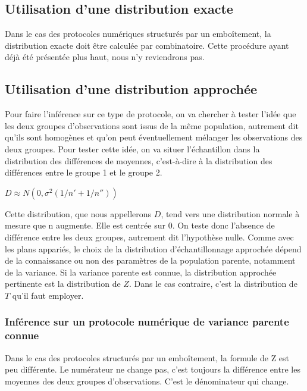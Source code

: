 \documentclass[]{book}
\theoremstyle{definition}
\theoremstyle{definition}
\theoremstyle{definition}
\theoremstyle{remark}
\begin{document}
\hypertarget{utilisation-dune-distribution-exacte-5}{%
\subsection{Utilisation d'une distribution
exacte}\label{utilisation-dune-distribution-exacte-5}}

Dans le cas des protocoles numériques structurés par un emboîtement, la
distribution exacte doit être calculée par combinatoire. Cette procédure
ayant déjà été présentée plus haut, nous n'y reviendrons pas.

\hypertarget{utilisation-dune-distribution-approchee-5}{%
\subsection{Utilisation d'une distribution
approchée}\label{utilisation-dune-distribution-approchee-5}}

Pour faire l'inférence sur ce type de protocole, on va chercher à tester
l'idée que les deux groupes d'observations sont issus de la même
population, autrement dit qu'ils sont homogènes et qu'on peut
éventuellement mélanger les observations des deux groupes. Pour tester
cette idée, on va situer l'échantillon dans la distribution des
différences de moyennes, c'est-à-dire à la distribution des différences
entre le groupe 1 et le groupe 2.

\(D\approx N(0,\sigma^{2}(1/n{}'+1/n{}''))\)

Cette distribution, que nous appellerons \(D\), tend vers une
distribution normale à mesure que n augmente. Elle est centrée sur 0. On
teste donc l'absence de différence entre les deux groupes, autrement dit
l'hypothèse nulle. Comme avec les plans appariés, le choix de la
distribution d'échantillonnage approchée dépend de la connaissance ou
non des paramètres de la population parente, notamment de la variance.
Si la variance parente est connue, la distribution approchée pertinente
est la distribution de \(Z\). Dans le cas contraire, c'est la
distribution de \(T\) qu'il faut employer.

\hypertarget{inference-sur-un-protocole-numerique-de-variance-parente-connue}{%
\subsubsection{Inférence sur un protocole numérique de variance parente
connue}\label{inference-sur-un-protocole-numerique-de-variance-parente-connue}}

Dans le cas des protocoles structurés par un emboîtement, la formule de
Z est peu différente. Le numérateur ne change pas, c'est toujours la
différence entre les moyennes des deux groupes d'observations. C'est le
dénominateur qui change.
\end{document}
